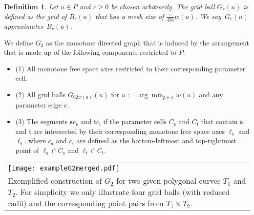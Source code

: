 \documentclass[a4paper,11pt]{article}
\newtheorem{definition}{Definition}
\begin{document}
\begin{definition}\label{def:gridball}
	Let $u \in P$ and $r \geq 0$ be chosen arbitrarily. The \emph{grid ball $G_r(u)$} is defined as the grid of $B_r(u)$ that has a mesh size of $\frac{\varepsilon}{456}w(u)$. We say~$G_r(u)$ \emph{approximates}~$B_r(u)$.
\end{definition}

We define $G_2$ as the monotone directed graph that is induced by the arrangement that is made up of the following components restricted to $P$: 

\noindent\begin{minipage}{0.52\linewidth}\vspace*{2ex}

	\begin{itemize}
		\item (1) All monotone free space axes restricted to their corresponding parameter cell.  
		\item (2) All grid balls $G_{62w(u)}(u)$ for $u := \arg \min_{p \in e}w(u)$ and any parameter edge $e$. 
		\item (3) The segments $\mathfrak{s}c_{\mathfrak{s}}$ and $\mathfrak{t}c_{\mathfrak{t}}$ if the parameter cells $C_{\mathfrak{s}}$ and $C_{\mathfrak{t}}$ that contain $\mathfrak{s}$ and $\mathfrak{t}$ are intersected by their corresponding monotone free space axes $\ell_{\mathfrak{s}}$ and $\ell_{\mathfrak{t}}$, where $c_{\mathfrak{s}}$ and $c_{\mathfrak{t}}$ are defined as the  bottom-leftmost and  top-rightmost point of $\ell_{\mathfrak{s}} \cap C_{\mathfrak{s}}$ and $\ell_{\mathfrak{t}} \cap C_{\mathfrak{t}}$.
	\end{itemize}
	
\end{minipage}
\begin{minipage}{0.4\linewidth}\vspace*{2ex}
\begin{center}
    \begin{tabular}{p{6cm}}
      \texttt{[image: exampleG2merged.pdf]}\\ 
{\small Exemplified construction of $G_2$ for two given polygonal curves $T_1$ and $T_2$.  For simplicity we only illustrate four grid balls (with reduced radii) and the corresponding point pairs from $T_1 \times T_2$.}
    \end{tabular}
  \end{center}
\end{minipage}\vspace*{2ex}
\end{document}
